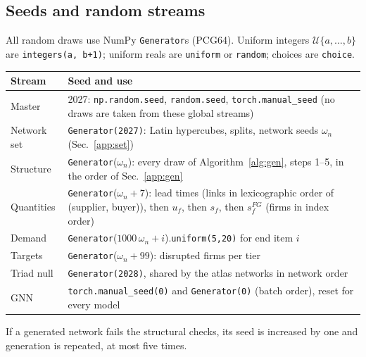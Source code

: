 \documentclass{ifacconf}
\begin{document}
\subsection{Seeds and random streams}
All random draws use NumPy \texttt{Generator}s (PCG64). Uniform integers $\mathcal{U}\{a,\dots,b\}$ are \texttt{integers(a, b+1)}; uniform reals are \texttt{uniform} or \texttt{random}; choices are \texttt{choice}.
\begin{center}\footnotesize
\begin{tabular}{p{2.6cm}p{5.2cm}}
\toprule
Stream & Seed and use \\
\midrule
Master & 2027: \texttt{np.random.seed}, \texttt{random.seed}, \texttt{torch.manual\_seed} (no draws are taken from these global streams) \\
Network set & \texttt{Generator(2027)}: Latin hypercubes, splits, network seeds $\omega_n$ (Sec.~\ref{app:set}) \\
Structure & \texttt{Generator}($\omega_n$): every draw of Algorithm~\ref{alg:gen}, steps 1--5, in the order of Sec.~\ref{app:gen} \\
Quantities & \texttt{Generator}($\omega_n+7$): lead times (links in lexicographic order of (supplier, buyer)), then $u_f$, then $s_f$, then $s^{FG}_f$ (firms in index order) \\
Demand & \texttt{Generator}($1000\,\omega_n+i$).\texttt{uniform(5,20)} for end item $i$ \\
Targets & \texttt{Generator}($\omega_n+99$): disrupted firms per tier \\
Triad null & \texttt{Generator(2028)}, shared by the atlas networks in network order \\
GNN & \texttt{torch.manual\_seed(0)} and \texttt{Generator(0)} (batch order), reset for every model \\
\bottomrule
\end{tabular}
\end{center}
If a generated network fails the structural checks, its seed is increased by one and generation is repeated, at most five times.
\end{document}
